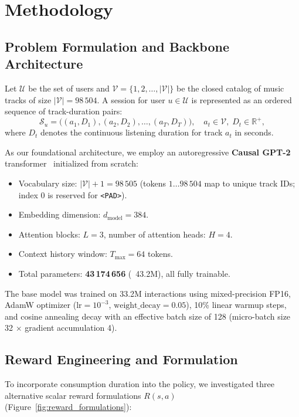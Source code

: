 \section{Methodology}
\label{sec:methodology}

\subsection{Problem Formulation and Backbone Architecture}
Let $\mathcal{U}$ be the set of users and $\mathcal{V} = \{1, 2, \dots, |\mathcal{V}|\}$ be the closed catalog of music tracks of size $|\mathcal{V}| = 98\,504$. A session for user $u \in \mathcal{U}$ is represented as an ordered sequence of track-duration pairs:
\begin{equation}
    \mathcal{S}_u = \big( (a_1, D_1), (a_2, D_2), \dots, (a_T, D_T) \big), \quad a_t \in \mathcal{V}, \; D_t \in \mathbb{R}^+,
\end{equation}
where $D_t$ denotes the continuous listening duration for track $a_t$ in seconds.

As our foundational architecture, we employ an autoregressive \textbf{Causal GPT-2} transformer~\cite{petrov2024aligning} initialized from scratch:
\begin{itemize}
    \item Vocabulary size: $|\mathcal{V}| + 1 = 98\,505$ (tokens $1 \dots 98\,504$ map to unique track IDs; index $0$ is reserved for \texttt{<PAD>}).
    \item Embedding dimension: $d_{\text{model}} = 384$.
    \item Attention blocks: $L = 3$, number of attention heads: $H = 4$.
    \item Context history window: $T_{\max} = 64$ tokens.
    \item Total parameters: \textbf{43\,174\,656} (~43.2M), all fully trainable.
\end{itemize}

The base model was trained on 33.2M interactions using mixed-precision FP16, AdamW optimizer ($\text{lr} = 10^{-3}$, $\text{weight\_decay} = 0.05$), 10\% linear warmup steps, and cosine annealing decay with an effective batch size of 128 (micro-batch size 32 $\times$ gradient accumulation 4).

\subsection{Reward Engineering and Formulation}
To incorporate consumption duration into the policy, we investigated three alternative scalar reward formulations $R(s, a)$ (Figure~\ref{fig:reward_formulations}):

